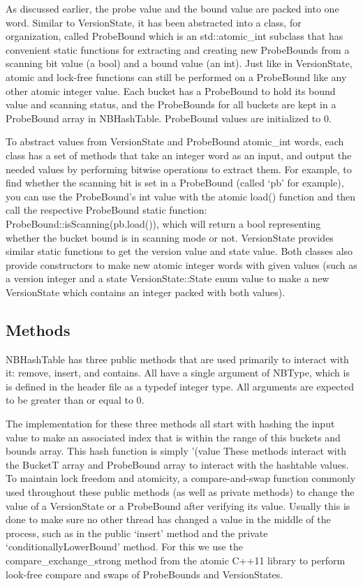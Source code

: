 \documentclass[journal]{IEEEtran}
\begin{document}
As discussed earlier, the probe value and the bound value are packed into one word. Similar to VersionState, it has been abstracted into a class, for organization, called ProbeBound which is an std::atomic\_int subclass that has convenient static functions for extracting and creating new ProbeBounds from a scanning bit value (a bool) and a bound value (an int). Just like in VersionState, atomic and lock-free functions can still be performed on a ProbeBound like any other atomic integer value.
Each bucket has a ProbeBound to hold its bound value and scanning status, and the ProbeBounds for all buckets are kept in a ProbeBound array in NBHashTable. ProbeBound values are initialized to 0.

To abstract values from VersionState and ProbeBound atomic\_int words, each class has a set of methods that take an integer word as an input, and output the needed values by performing bitwise operations to extract them. For example, to find whether the scanning bit is set in a ProbeBound (called ‘pb’ for example), you can use the ProbeBound’s int value with the atomic load() function and then call the respective ProbeBound static function: ProbeBound::isScanning(pb.load()), which will return a bool representing whether the bucket bound is in scanning mode or not. VersionState provides similar static functions to get the version value and state value. Both classes also provide constructors to make new atomic integer words with given values (such as a version integer and a state VersionState::State enum value to make a new VersionState which contains an integer packed with both values).

\subsection{Methods}
NBHashTable has three public methods that are used primarily to interact with it: remove, insert, and contains. All have a single argument of NBType, which is is defined in the header file as a typedef integer type. All arguments are expected to be greater than or equal to 0.

The implementation for these three methods all start with hashing the input value to make an associated index that is within the range of this buckets and bounds array. This hash function is simply ’(value %
These methods interact with the BucketT array and ProbeBound array to interact with the hashtable values. To maintain lock freedom and atomicity, a compare-and-swap function commonly used throughout these public methods (as well as private methods) to change the value of a VersionState or a ProbeBound after verifying its value. Usually this is done to make sure no other thread has changed a value in the middle of the process, such as in the public ‘insert’ method and the private ‘conditionallyLowerBound’ method. For this we use the compare\_exchange\_strong method from the atomic C++11 library to perform look-free compare and swaps of ProbeBounds and VersionStates.
\end{document}

